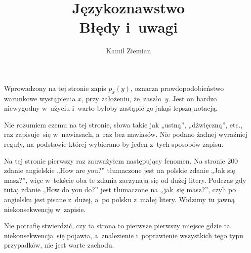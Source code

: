 \documentclass[a4paper,11pt]{article}
\title{Językoznawstwo \\
  Błędy i~uwagi}
\author{Kamil Ziemian}
\begin{document}





\maketitle %







\start {} Wprowadzony na tej stronie zapis $p_{ x }( y )$, oznacza
prawdopodobieństwo warunkowe wystąpienia $x$, przy założeniu, że~zaszło~$y$.
Jest on bardzo niewygodny w~użyciu i~warto byłoby zastąpić go jakąś lepszą
notacją.

\vspace{\spaceFour}





\start {} Nie rozumiem czemu na tej stronie, słowa takie jak „ustną”,
„dźwięczną”, etc., raz zapisuje~się w~nawiasach, a~raz bez nawiasów. Nie
podano żadnej wyraźniej reguły, na podstawie której wybierano by jeden z~tych
sposobów zapisu.

\vspace{\spaceFour}





\start {} Na tej stronie pierwszy raz zauważyłem następujący fenomen.
Na stronie 200 zdanie angielskie „How are you?” tłumaczone jest na polskie
zdanie „Jak się masz?”, więc w~tekście oba te zdania zaczynają się od dużej
litery. Podczas gdy tutaj zdanie „How do you do?” jest tłumaczone na
„jak~się masz?”, czyli po angielsku jest pisane z~dużej, a~po polsku z~małej
litery. Widzimy tu jawną niekonsekwencję w~zapisie.

Nie potrafię stwierdzić, czy ta strona to pierwsze pierwszy miejsce gdzie ta
niekonsekwencja~się pojawia, a~znalezienie i~poprawienie wszystkich tego
typu przypadków, nie jest warte zachodu.

\vspace{\spaceFour}
\end{document}
